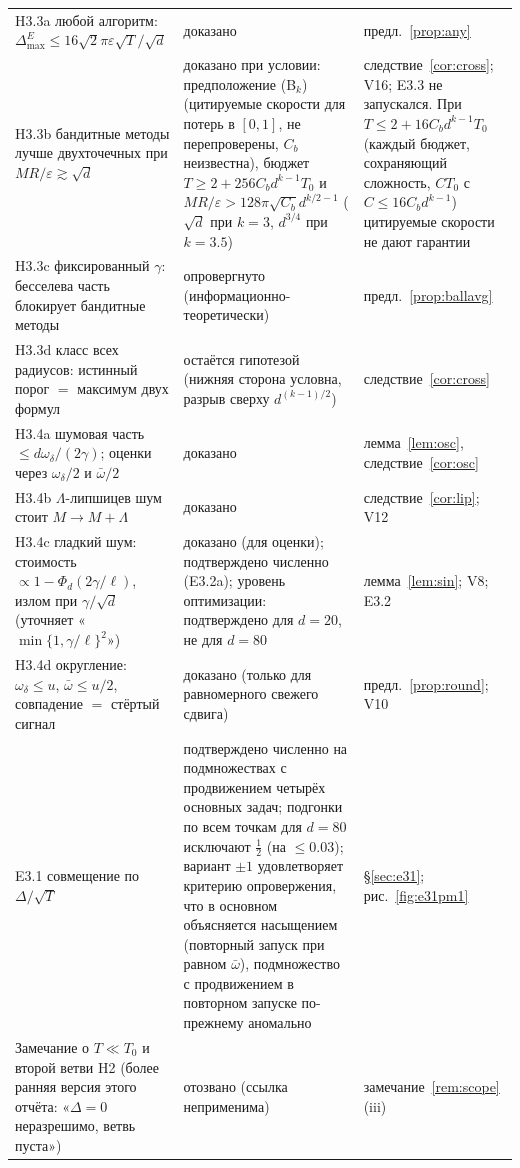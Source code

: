 \documentclass[11pt,a4paper]{article}
\numberwithin{equation}{section}
\theoremstyle{definition}
\theoremstyle{remark}
\newcommand{\Dmax}{\Delta_{\max}}\newcommand{\Dcp}{\Delta_{\rm cp}}\newcommand{\Dlow}{\Delta_{\rm low}}
\newcommand{\wbar}{\bar\omega}\newcommand{\Atwo}{\cA^{\rm 2pt}_\gamma}
\begin{document}
{\begin{xltabular}{\textwidth}{@{}>{\raggedright\arraybackslash}p{5.3cm}>{\raggedright\arraybackslash}p{4.6cm}>{\raggedright\arraybackslash}X@{}}
H3.3a любой алгоритм: $\Dmax^E\le16\sqrt2\pi\varepsilon\sqrt T/\sqrt d$ & доказано & предл.~\ref{prop:any}\\
H3.3b бандитные методы лучше двухточечных при $MR/\varepsilon\gtrsim\sqrt d$ & доказано при условии: предположение (B$_k$) (цитируемые скорости для потерь в $[0,1]$, не перепроверены, $C_b$ неизвестна), бюджет $T\ge2+256C_bd^{k-1}T_0$ и $MR/\varepsilon>128\pi\sqrt{C_b}d^{k/2-1}$ ($\sqrt d$ при $k=3$, $d^{3/4}$ при $k=3.5$) & следствие~\ref{cor:cross}; V16; E3.3 не запускался. При $T\le2+16C_bd^{k-1}T_0$ (каждый бюджет, сохраняющий сложность, $CT_0$ с $C\le16C_bd^{k-1}$) цитируемые скорости не дают гарантии\\
H3.3c фиксированный $\gamma$: бесселева часть блокирует бандитные методы & опровергнуто (информационно-теоретически) & предл.~\ref{prop:ballavg}\\
H3.3d класс всех радиусов: истинный порог $=$ максимум двух формул & остаётся гипотезой (нижняя сторона условна, разрыв сверху $d^{(k-1)/2}$) & следствие~\ref{cor:cross}\\
H3.4a шумовая часть $\le d\omega_\delta/(2\gamma)$; оценки через $\omega_\delta/2$ и $\wbar/2$ & доказано & лемма~\ref{lem:osc}, следствие~\ref{cor:osc}\\
H3.4b $\Lambda$-липшицев шум стоит $M\to M+\Lambda$ & доказано & следствие~\ref{cor:lip}; V12\\
H3.4c гладкий шум: стоимость $\propto1-\Phi_d(2\gamma/\ell)$, излом при $\gamma/\sqrt d$ (уточняет «$\min\{1,\gamma/\ell\}^2$») & доказано (для оценки); подтверждено численно (E3.2a); уровень оптимизации: подтверждено для $d=20$, не для $d=80$ & лемма~\ref{lem:sin}; V8; E3.2\\
H3.4d округление: $\omega_\delta\le u$, $\wbar\le u/2$, совпадение $=$ стёртый сигнал & доказано (только для равномерного свежего сдвига) & предл.~\ref{prop:round}; V10\\
E3.1 совмещение по $\Delta/\sqrt T$ & подтверждено численно на подмножествах с продвижением четырёх основных задач; подгонки по всем точкам для $d=80$ исключают $\frac12$ (на $\le0.03$); вариант $\pm1$ удовлетворяет критерию опровержения, что в основном объясняется насыщением (повторный запуск при равном $\wbar$), подмножество с продвижением в повторном запуске по-прежнему аномально & \S\ref{sec:e31}; рис.~\ref{fig:e31pm1}\\
Замечание о $T\ll T_0$ и второй ветви H2 (более ранняя версия этого отчёта: «$\Delta=0$ неразрешимо, ветвь пуста») & отозвано (ссылка неприменима) & замечание~\ref{rem:scope}(iii)\\
\bottomrule
\end{xltabular}}
\end{document}
